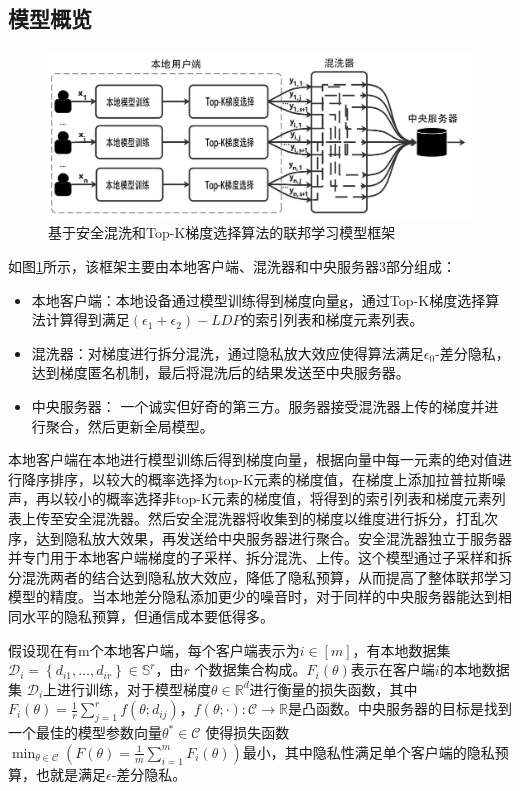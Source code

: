 \subsection{模型概览}
\begin{figure}[!hbt]
\centering
	\includegraphics[scale=0.5]{fig2/C4/模型概况图}%
	\caption{基于安全混洗和Top-K梯度选择算法的联邦学习模型框架}
	\label{fig:基于安全混洗和Top-K梯度选择算法的联邦学习模型框架}	
\end{figure}

如图\ref{fig:基于安全混洗和Top-K梯度选择算法的联邦学习模型框架}所示，该框架主要由本地客户端、混洗器和中央服务器3部分组成：
\begin{itemize}
  \item 本地客户端：本地设备通过模型训练得到梯度向量$\mathbf{g}$，通过Top-K梯度选择算法计算得到满足$\left(\epsilon_{1}+\epsilon_{2}\right)-LDP$的索引列表和梯度元素列表。
  \item 混洗器：对梯度进行拆分混洗，通过隐私放大效应使得算法满足$\epsilon_{0}$-差分隐私，达到梯度匿名机制，最后将混洗后的结果发送至中央服务器。
  \item 中央服务器： 一个诚实但好奇的第三方。服务器接受混洗器上传的梯度并进行聚合，然后更新全局模型。
\end{itemize}

本地客户端在本地进行模型训练后得到梯度向量，根据向量中每一元素的绝对值进行降序排序，以较大的概率选择为top-K元素的梯度值，在梯度上添加拉普拉斯噪声，再以较小的概率选择非top-K元素的梯度值，将得到的索引列表和梯度元素列表上传至安全混洗器。然后安全混洗器将收集到的梯度以维度进行拆分，打乱次序，达到隐私放大效果，再发送给中央服务器进行聚合。安全混洗器独立于服务器并专门用于本地客户端梯度的子采样、拆分混洗、上传。这个模型通过子采样和拆分混洗两者的结合达到隐私放大效应，降低了隐私预算，从而提高了整体联邦学习模型的精度。当本地差分隐私添加更少的噪音时，对于同样的中央服务器能达到相同水平的隐私预算，但通信成本要低得多。

假设现在有m个本地客户端，每个客户端表示为$i \in[m]$，有本地数据集\\$\mathcal{D}_{i}=\left\{d_{i 1}, \ldots, d_{i r}\right\} \in \mathbb{S}^{r}$，由$r$ 个数据集合构成。$F_{i}(\theta)$表示在客户端$i$的本地数据集 $\mathcal{D}_{i}$上进行训练，对于模型梯度$\theta \in \mathbb{R}^{d}$进行衡量的损失函数，其中$F_{i}(\theta)=\frac{1}{r} \sum_{j=1}^{r} f\left(\theta ; d_{i j}\right)$，$f(\theta ; \cdot): \mathcal{C} \rightarrow \mathbb{R}$是凸函数。中央服务器的目标是找到一个最佳的模型参数向量$\theta^{*} \in \mathcal{C}$ 使得损失函数$\min _{\theta \in \mathcal{C}}\left(F(\theta)=\frac{1}{m} \sum_{i=1}^{m} F_{i}(\theta)\right)$最小，其中隐私性满足单个客户端的隐私预算，也就是满足$\epsilon$-差分隐私。

